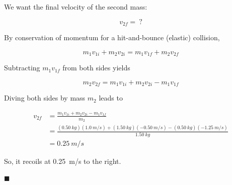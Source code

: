 \documentclass[dvipsnames]{article}
\begin{document}
We want the final velocity of the second mass:

\begin{equation*}
    v_{2f} = \ ?
\end{equation*}

By conservation of momentum for a hit-and-bounce (elastic) collision, 

\begin{equation*}
    m_1 v_{1i} + m_2 v_{2i} = m_1 v_{1f} + m_2 v_{2f}
\end{equation*}

Subtracting $m_1 v_{1f}$ from both sides yields

\begin{equation*}
    m_2 v_{2f} = m_1 v_{1i} + m_2 v_{2i} - m_1 v_{1f} 
\end{equation*}

Diving both sides by mass $m_2$ leads to

\begin{align*}
    v_{2f} &= \frac{m_1 v_{1i} + m_2 v_{2i} - m_1 v_{1f}}{m_2} \\[1ex]
    &= \frac{(\SI{0.50}{kg})(\SI{1.0}{m/s}) + (\SI{1.50}{kg})(\SI{-0.50}{m/s}) - (\SI{0.50}{kg})(\SI{-1.25}{m/s})}{\SI{1.50}{kg}} \\[1ex]
    &= \boxed{\SI{0.25}{m/s}}
\end{align*}

So, it recoils at \SI{0.25}{m/s} to the right.

\hfill $\blacksquare$
\end{document}
